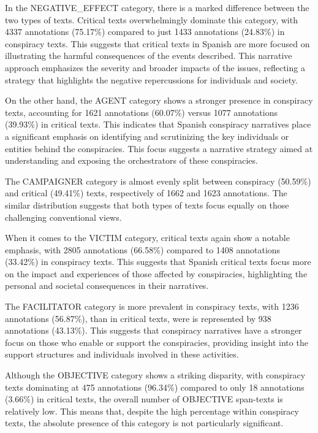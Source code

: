 \documentclass{Configuration_Files/PoliMi3i_thesis}
\begin{document}
In the NEGATIVE\_EFFECT category, there is a marked difference between the two types of texts. Critical texts overwhelmingly dominate this category, with 4337 annotations (75.17\%) compared to just 1433 annotations (24.83\%) in conspiracy texts. This suggests that critical texts in Spanish are more focused on illustrating the harmful consequences of the events described. This narrative approach emphasizes the severity and broader impacts of the issues, reflecting a strategy that highlights the negative repercussions for individuals and society.

On the other hand, the AGENT category shows a stronger presence in conspiracy texts, accounting for 1621 annotations (60.07\%) versus 1077 annotations (39.93\%) in critical texts. This indicates that Spanish conspiracy narratives place a significant emphasis on identifying and scrutinizing the key individuals or entities behind the conspiracies. This focus suggests a narrative strategy aimed at understanding and exposing the orchestrators of these conspiracies.

The CAMPAIGNER category is almost evenly split between conspiracy (50.59\%) and critical (49.41\%) texts, respectively of 1662 and 1623 annotations. The similar distribution suggests that both types of texts focus equally on those challenging conventional views.

When it comes to the VICTIM category, critical texts again show a notable emphasis, with 2805 annotations (66.58\%) compared to 1408 annotations (33.42\%) in conspiracy texts. This suggests that Spanish critical texts focus more on the impact and experiences of those affected by conspiracies, highlighting the personal and societal consequences in their narratives.

The FACILITATOR category is more prevalent in conspiracy texts, with 1236 annotations (56.87\%), than in critical texts, were is represented by 938 annotations (43.13\%). This suggests that conspiracy narratives have a stronger focus on those who enable or support the conspiracies, providing insight into the support structures and individuals involved in these activities.

Although the OBJECTIVE category shows a striking disparity, with conspiracy texts dominating at 475 annotations (96.34\%) compared to only 18 annotations (3.66\%) in critical texts, the overall number of OBJECTIVE span-texts is relatively low. This means that, despite the high percentage within conspiracy texts, the absolute presence of this category is not particularly significant.
\end{document}
